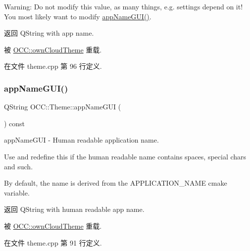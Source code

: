 Warning\+: Do not modify this value, as many things, e.\+g. settings depend on it! You most likely want to modify \hyperlink{class_o_c_c_1_1_theme_a65e92dc2b2dff6e39fe2e0362dbe6327}{app\+Name\+G\+U\+I()}.

\begin{DoxyReturn}{返回}
Q\+String with app name. 
\end{DoxyReturn}


被 \hyperlink{class_o_c_c_1_1own_cloud_theme_a96f74e2ad1c65799f9bd3955cc4c50ee}{O\+C\+C\+::own\+Cloud\+Theme} 重载.



在文件 theme.\+cpp 第 96 行定义.

\mbox{\label{class_o_c_c_1_1_theme_a65e92dc2b2dff6e39fe2e0362dbe6327}} 
\subsubsection{\texorpdfstring{app\+Name\+G\+U\+I()}{appNameGUI()}}
{\footnotesize\ttfamily Q\+String O\+C\+C\+::\+Theme\+::app\+Name\+G\+UI (\begin{DoxyParamCaption}{ }\end{DoxyParamCaption}) const\hspace{0.3cm}{\ttfamily [virtual]}}



app\+Name\+G\+UI -\/ Human readable application name. 

Use and redefine this if the human readable name contains spaces, special chars and such.

By default, the name is derived from the A\+P\+P\+L\+I\+C\+A\+T\+I\+O\+N\+\_\+\+N\+A\+ME cmake variable.

\begin{DoxyReturn}{返回}
Q\+String with human readable app name. 
\end{DoxyReturn}


被 \hyperlink{class_o_c_c_1_1own_cloud_theme_ae4d6581e7332b009cfd6445bd23a9b95}{O\+C\+C\+::own\+Cloud\+Theme} 重载.



在文件 theme.\+cpp 第 91 行定义.

\mbox{\label{class_o_c_c_1_1_theme_a998943bafbde46e6eb606876d06a003c}} 
